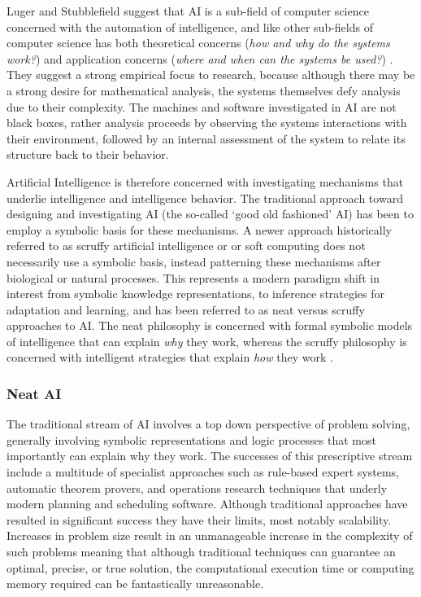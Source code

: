 Luger and Stubblefield suggest that AI is a sub-field of computer science concerned with the automation of intelligence, and like other sub-fields of computer science has both theoretical concerns (\emph{how and why do the systems work?}) and application concerns (\emph{where and when can the systems be used?}) \cite{Luger1993}. They suggest a strong empirical focus to research, because although there may be a strong desire for mathematical analysis, the systems themselves defy analysis due to their complexity. The machines and software investigated in AI are not black boxes, rather analysis proceeds by observing the systems interactions with their environment, followed by an internal assessment of the system to relate its structure back to their behavior.

Artificial Intelligence is therefore concerned with investigating mechanisms that underlie intelligence and intelligence behavior. The traditional approach toward designing and investigating AI (the so-called `good old fashioned' AI) has been to employ a symbolic basis for these mechanisms. A newer approach historically referred to as scruffy artificial intelligence or or soft computing does not necessarily use a symbolic basis, instead patterning these mechanisms after biological or natural processes. This represents a modern paradigm shift in interest from symbolic knowledge representations, to inference strategies for adaptation and learning, and has been referred to as neat versus scruffy approaches to AI. The neat philosophy is concerned with formal symbolic models of intelligence that can explain \emph{why} they work, whereas the scruffy philosophy is concerned with intelligent strategies that explain \emph{how} they work \cite{Sloman1990}.

\subsubsection{Neat AI}
The traditional stream of AI involves a top down perspective of problem solving, generally involving symbolic representations and logic processes that most importantly can explain why they work. The successes of this prescriptive stream include a multitude of specialist approaches such as rule-based expert systems, automatic theorem provers, and operations research techniques that underly modern planning and scheduling software. Although traditional approaches have resulted in significant success they have their limits, most notably scalability. Increases in problem size result in an unmanageable increase in the complexity of such problems meaning that although traditional techniques can guarantee an optimal, precise, or true solution, the computational execution time or computing memory required can be fantastically unreasonable.

